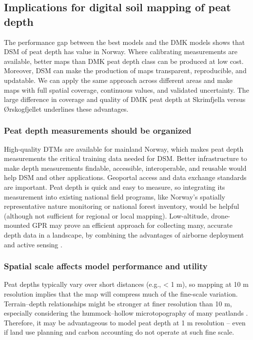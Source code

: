 \documentclass[soil, manuscript]{copernicus}
\begin{document}
\subsection{Implications for digital soil mapping of peat depth}

The performance gap between the best models and the DMK models shows that DSM of peat depth has value in Norway.
Where calibrating measurements are available, better maps than DMK peat depth class can be produced at low cost.
Moreover, DSM can make the production of maps transparent, reproducible, and updatable.
We can apply the same approach across different areas and make maps with full spatial coverage, continuous values, and validated uncertainty.
The large difference in coverage and quality of DMK peat depth at Skrimfjella versus Ørskogfjellet underlines these advantages.

\subsubsection{Peat depth measurements should be organized}

High-quality DTMs are available for mainland Norway, which makes peat depth measurements the critical training data needed for DSM.
Better infrastructure to make depth measurements findable, accessible, interoperable, and reusable would help DSM and other applications.
Geoportal access and data exchange standards \citeyearpar[like Natural England's for peat surveys,][]{naturalenglandDataExchangeStandard2023} are important.
Peat depth is quick and easy to measure, so integrating its measurement into existing national field programs, like Norway's spatially representative nature monitoring or national forest inventory, would be helpful (although not sufficient for regional or local mapping).
Low-altitude, drone-mounted GPR may prove an efficient approach for collecting many, accurate depth data in a landscape, by combining the advantages of airborne deployment and active sensing \citep{pelletierPeatAnalysesHudson1991, ruolsDevelopmentDronebasedGroundpenetrating2023}.

\subsubsection{Spatial scale affects model performance and utility}

Peat depths typically vary over short distances (e.g., \textless{} 1 m), so mapping at 10 m resolution implies that the map will compress much of the fine-scale variation.
Terrain--depth relationships might be stronger at finer resolution than 10 m, especially considering the hummock--hollow microtopography of many peatlands \citep{rydin7Mires1999, lindsayPeatbogsCarbonCritical2010}.
Therefore, it may be advantageous to model peat depth at 1 m resolution -- even if land use planning and carbon accounting do not operate at such fine scale.
\end{document}
